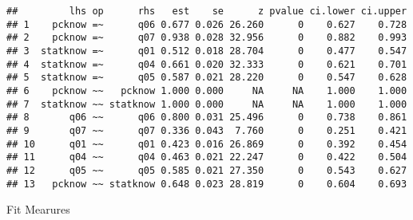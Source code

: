 \documentclass[
]{article}
\newenvironment{Shaded}{\begin{snugshade}}{\end{snugshade}}
\newcommand{\FunctionTok}[1]{\textcolor[rgb]{0.00,0.00,0.00}{#1}}
\newcommand{\NormalTok}[1]{#1}
\newcommand{\SpecialCharTok}[1]{\textcolor[rgb]{0.00,0.00,0.00}{#1}}
\begin{document}
\begin{verbatim}
##         lhs op      rhs   est    se      z pvalue ci.lower ci.upper
## 1    pcknow =~      q06 0.677 0.026 26.260      0    0.627    0.728
## 2    pcknow =~      q07 0.938 0.028 32.956      0    0.882    0.993
## 3  statknow =~      q01 0.512 0.018 28.704      0    0.477    0.547
## 4  statknow =~      q04 0.661 0.020 32.333      0    0.621    0.701
## 5  statknow =~      q05 0.587 0.021 28.220      0    0.547    0.628
## 6    pcknow ~~   pcknow 1.000 0.000     NA     NA    1.000    1.000
## 7  statknow ~~ statknow 1.000 0.000     NA     NA    1.000    1.000
## 8       q06 ~~      q06 0.800 0.031 25.496      0    0.738    0.861
## 9       q07 ~~      q07 0.336 0.043  7.760      0    0.251    0.421
## 10      q01 ~~      q01 0.423 0.016 26.869      0    0.392    0.454
## 11      q04 ~~      q04 0.463 0.021 22.247      0    0.422    0.504
## 12      q05 ~~      q05 0.585 0.021 27.350      0    0.543    0.627
## 13   pcknow ~~ statknow 0.648 0.023 28.819      0    0.604    0.693
\end{verbatim}

Fit Mearures

\begin{Shaded}
\end{Shaded}
\end{document}
